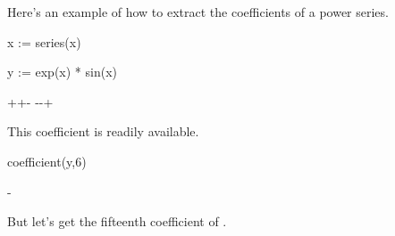 {{{{{{{{{{{{{{\begin{xtc}
\begin{xtccomment}
Here's an example of how to extract the coefficients of a power series.
\end{xtccomment}
\begin{spadsrc}
x := series(x) 
\end{spadsrc}
\begin{TeXOutput}
\begin{fricasmath}{1}
%
\end{fricasmath}
\end{TeXOutput}
\end{xtc}
\begin{xtc}
\begin{xtccomment}
\end{xtccomment}
\begin{spadsrc}
y := exp(x) * sin(x) 
\end{spadsrc}
\begin{TeXOutput}
\begin{fricasmath}{2}
++\TIMES {}-{%
\TIMES {}}-{\TIMES {}}-{\TIMES {}}+%
\end{fricasmath}
\end{TeXOutput}
\end{xtc}
\begin{xtc}
\begin{xtccomment}
This coefficient is readily available.
\end{xtccomment}
\begin{spadsrc}
coefficient(y,6) 
\end{spadsrc}
\begin{TeXOutput}
\begin{fricasmath}{3}
-{}%
\end{fricasmath}
\end{TeXOutput}
\end{xtc}
\begin{xtc}
\begin{xtccomment}
But let's get the fifteenth coefficient of .
\end{xtccomment}
\begin{spadsrc}

\end{spadsrc}
\end{xtc}}}}}}}}}}}}}}}
